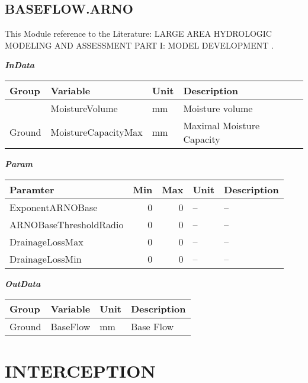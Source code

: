 \documentclass[
]{book}
\begin{document}
\hypertarget{baseflow.arno}{%
\subsection{BASEFLOW.ARNO}\label{baseflow.arno}}

This Module reference to the Literature: LARGE AREA HYDROLOGIC MODELING AND ASSESSMENT PART I: MODEL DEVELOPMENT \citep{Arnold.1998}.

\textbf{\emph{InData}}

\begin{table}[!h]
\centering
\begin{tabular}{l|l|l|l}
\hline
Group & Variable & Unit & Description\\
\hline
 & MoistureVolume & mm & Moisture volume\\
\cline{2-4}
\multirow{-2}{*}{\raggedright\arraybackslash Ground} & MoistureCapacityMax & mm & Maximal Moisture Capacity\\
\hline
\end{tabular}
\end{table}

\textbf{\emph{Param}}

\begin{table}[!h]
\centering
\begin{tabular}{l|r|r|l|l}
\hline
Paramter & Min & Max & Unit & Description\\
\hline
ExponentARNOBase & 0 & 0 & -- & --\\
\cline{1-5}
ARNOBaseThresholdRadio & 0 & 0 & -- & --\\
\cline{1-5}
DrainageLossMax & 0 & 0 & -- & --\\
\cline{1-5}
DrainageLossMin & 0 & 0 & -- & --\\
\hline
\end{tabular}
\end{table}

\textbf{\emph{OutData}}

\begin{table}[!h]
\centering
\begin{tabular}{l|l|l|l}
\hline
Group & Variable & Unit & Description\\
\hline
Ground & BaseFlow & mm & Base Flow\\
\hline
\end{tabular}
\end{table}

\hypertarget{interception}{%
\section{INTERCEPTION}\label{interception}}
\end{document}
